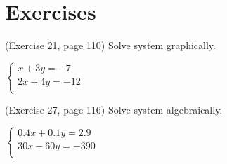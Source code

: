 \section{\large Exercises}


\begin{exer}(Exercise 21, page 110)
    Solve system graphically.
    \begin{center}
        $\begin{cases}
            x + 3y = -7\\
            2x + 4y = -12\\
        \end{cases}$
    \end{center}
\end{exer}

\begin{exer}(Exercise 27, page 116)
    Solve system algebraically.
    \begin{center}
        $\begin{cases}
            0.4 x + 0.1y = 2.9\\[2mm]
            30x - 60y = -390\\
        \end{cases}$
    \end{center}
\end{exer}


